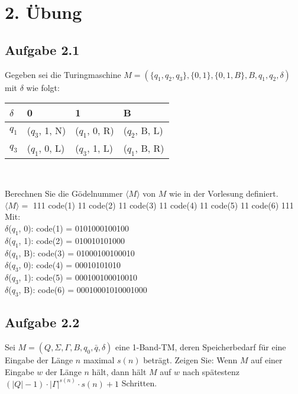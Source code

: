 \section*{2. Übung}
\subsection*{Aufgabe 2.1}
Gegeben sei die Turingmaschine $M=(\{q_1, q_2, q_3\}, \{0,1\}, \{0,1,B\}, B, q_1, q_2, \delta)$ mit $\delta$ wie folgt:
\begin{center}
	\begin{tabular}{l|lll}
		$\delta$ & \hspace{0.6cm}0 & \hspace{0.6cm}1 & \hspace{0.6cm}B \\ \hline
		$q_1$ & ($q_3$, 1, N) & ($q_1$, 0, R) & ($q_2$, B, L) \\
		$q_3$ & ($q_1$, 0, L) & ($q_3$, 1, L) & ($q_1$, B, R)
	\end{tabular}\\
\end{center}
Berechnen Sie die Gödelnummer $\langle M \rangle$ von $M$ wie in der Vorlesung definiert.
\\

$\langle M \rangle = $ 111 code(1) 11 code(2) 11 code(3) 11 code(4) 11 code(5) 11 code(6) 111
\\

Mit:
\\
$\delta$($q_{1}$, 0): code(1) = 0101000100100
\\
$\delta$($q_{1}$, 1): code(2) = 010010101000
\\
$\delta$($q_{1}$, B): code(3) = 01000100100010
\\
$\delta$($q_{3}$, 0): code(4) = 00010101010
\\
$\delta$($q_{3}$, 1): code(5) = 000100100010010
\\
$\delta$($q_{3}$, B): code(6) = 00010001010001000
\\


\subsection*{Aufgabe 2.2}
Sei $M = (Q, \Sigma, \Gamma, B, q_0, \bar{q}, \delta)$ eine 1-Band-TM, deren Speicherbedarf für eine Eingabe der Länge $n$ maximal $s(n)$ beträgt. Zeigen Sie: Wenn $M$ auf einer Eingabe $w$ der Länge $n$ hält, dann hält $M$ auf $w$ nach spätestenz $(\left| Q\right| -1) \cdot \left| \Gamma\right|^{s(n)} \cdot s(n)+1$ Schritten.\\\\

